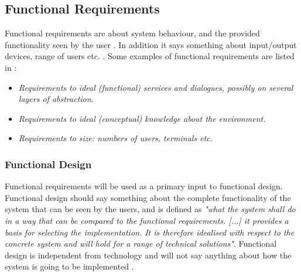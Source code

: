 \subsection{Functional Requirements}
Functional requirements are about system behaviour, and the provided functionality seen by the user \cite{systemutviklingDel1}. In addition it says something about input/output devices, range of users etc. \cite{mmi}. Some examples of functional requirements are listed in \cite{systemutviklingDel1}:
\begin{itemize}
\item \emph{Requirements to ideal (functional) services and dialogues, possibly on several layers of abstraction.}
\item \emph{Requirements to ideal (conceptual) knowledge about the environment.}
\item \emph{Requirements to size: numbers of users, terminals etc.}
\end{itemize}     

\subsubsection{Functional Design}
Functional requirements will be used as a primary input to functional design. Functional design should say something about the complete functionality of the system that can be seen by the users, and is defined as \emph{"what the system shall do in a way that can be compared to the functional requirements. [...] it provides a basis for selecting the implementation. It is therefore idealised with respect to the concrete system and will hold for a range of technical solutions"}. Functional design is independent from technology and will not say anything about how the system is going to be implemented \cite{systemutviklingDel1}. 

